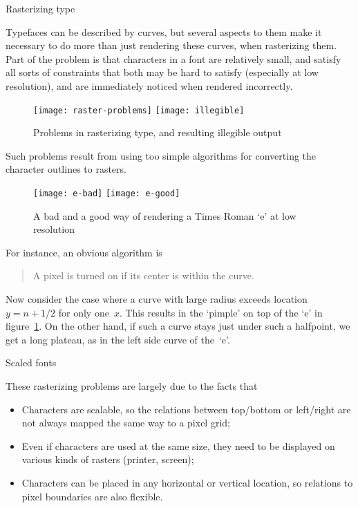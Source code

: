  {Rasterizing type}

Typefaces can be described by curves, but several aspects to them make
it necessary to do more than just rendering these curves, when
rasterizing them. Part of the problem is that characters in a font are
relatively small, and satisfy all sorts of constraints that both may be
hard to satisfy (especially at low resolution), and are immediately
noticed when rendered incorrectly.
\begin{figure}[ht]
\texttt{[image: raster-problems]}
\texttt{[image: illegible]}
\caption{Problems in rasterizing type, and resulting illegible output}
\end{figure}

Such problems result from using too simple algorithms for converting
the character outlines to rasters.
\begin{figure}[ht]
\texttt{[image: e-bad]}
\texttt{[image: e-good]}
\caption{A bad and a good way of rendering a Times Roman `e' at low
  resolution}
\label{fig:e-pimple}
\end{figure}
For instance, an obvious algorithm is
\begin{quote}
A pixel is turned on if its center is within the curve.
\end{quote}
Now consider the case where a curve with large radius exceeds location
$y=n+1/2$ for only one~$x$. This results in the `pimple' on top of the
`e' in figure~\ref{fig:e-pimple}. On the other hand, if such a curve
stays just under such a halfpoint, we get a long plateau, as in the
left side curve of the~`e'.

 {Scaled fonts}

These rasterizing problems are largely due to the facts that
\begin{itemize}
\item Characters are scalable, so the relations between top/bottom or
  left/right are not always mapped the same way to a pixel grid;
\item Even if characters are used at the same size, they need to be
  displayed on various kinds of rasters (printer, screen);
\item Characters can be placed in any horizontal or vertical location,
  so relations to pixel boundaries are also flexible.
\end{itemize}

